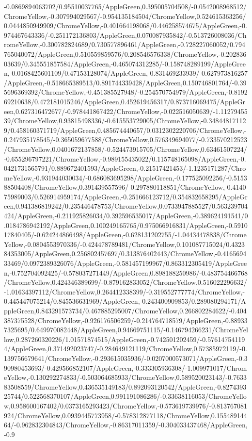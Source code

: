 {\begin{tikzternal}
-0.0869894063702/0.95510037765/AppleGreen,0.395005704508/-0.0542008968512/ChromeYellow,-0.307994029567/-0.954135184504/ChromeYellow,0.524615363256/0.0444850949909/ChromeYellow,-0.401664198068/0.446258574675/AppleGreen,-0.974467643336/-0.251172136803/AppleGreen,0.070087935842/-0.513726008036/ChromeYellow,-0.300782824689/0.730577896461/AppleGreen,-0.728227060052/0.794765040072/AppleGreen,0.510559859576/0.208546576338/ChromeYellow,-0.20283603639/0.345551857584/AppleGreen,-0.465074312285/-0.158748289199/AppleGreen,-0.0168425601109/0.47153128074/AppleGreen,-0.831469233939/-0.627973816257/AppleGreen,-0.518665389513/0.891744339428/AppleGreen,0.150746801764/-0.395696369392/ChromeYellow,-0.451385527948/-0.254570754979/AppleGreen,-0.819269210638/0.472181015246/AppleGreen,0.452619456317/0.873716069475/AppleGreen,0.627316472677/-0.978441867422/ChromeYellow,-0.022516050639/-1.1127945539/ChromeYellow,0.93815498336/-0.615553729005/ChromeYellow,-0.348448171129/0.458160371719/AppleGreen,0.485674440657/0.0312302220706/ChromeYellow,-0.247935178545/-0.365059677588/ChromeYellow,0.576349694077/-0.733570212523/ChromeYellow,0.0401672137858/-0.524473915705/ChromeYellow,0.63461507224/-0.655296797221/ChromeYellow,-0.989155435022/0.115748165098/AppleGreen,-0.0421731565791/0.889672401593/AppleGreen,-0.21517421453/-1.1235171287/ChromeYellow,-0.931944030034/-0.686083695298/AppleGreen,-0.177525092256/-0.515388504408/ChromeYellow,0.391439557596/-0.297880118851/ChromeYellow,-0.414075989003/0.526914959174/AppleGreen,-0.251666123712/0.354832658295/AppleGreen,0.941386819242/0.235446478753/ChromeYellow,0.0733947885527/0.563239704424/AppleGreen,-0.211925826034/0.392596535017/AppleGreen,-0.389624191541/0.0184786942192/AppleGreen,0.100249165765/0.975066916831/AppleGreen,-0.591017840405/-0.624244866498/AppleGreen,-0.628131202755/-1.04434478838/ChromeYellow,-0.0804553970336/-0.424478789481/ChromeYellow,0.101087715024/0.432384353005/AppleGreen,0.256802457697/0.313876402443/ChromeYellow,-0.416569433469/0.0972389326076/AppleGreen,-0.581457199967/0.863312305419/AppleGreen,-0.752704092425/-0.578037271449/AppleGreen,0.898188250986/-0.483754466768/ChromeYellow,0.424346389699/-0.879162833052/ChromeYellow,0.516022296632/-1.01634397112/ChromeYellow,0.264412338399/-0.319552777774/ChromeYellow,-0.445447075214/0.845536631969/AppleGreen,-0.243400909853/0.289080294171/AppleGreen,0.843291573734/0.467885295007/ChromeYellow,0.266802284622/-0.404387375528/ChromeYellow,-0.926176506259/-0.214764718579/AppleGreen,-0.889337325695/0.649970082448/AppleGreen,0.94669751115/-0.146794266231/ChromeYellow,0.287260320226/1.01571874515/AppleGreen,-0.742501202459/-0.576147541194/AppleGreen,0.371492023747/-0.284649121119/ChromeYellow,0.57385972119/-0.139756679641/ChromeYellow,-0.293615035936/-0.0207000573071/AppleGreen,-0.390980453693/-0.429566852107/AppleGreen,-0.333305936308/-1.009971017/ChromeYellow,-0.130292274833/-0.503064685933/ChromeYellow,0.589520023143/-0.763383508559/ChromeYellow,0.436535149183/0.892093120542/AppleGreen,-0.827439325744/0.522568370107/AppleGreen,0.991191086286/-0.33638116053/ChromeYellow,0.958600167402/0.0373165293423/ChromeYellow,-0.573619739976/-0.813767081924/ChromeYellow,0.0939445773958/-0.578312877118/ChromeYellow,0.15548914464/-0.962832304843/ChromeYellow,-0.86317011359/-0.304033437468/AppleGreen,-0.9
\end{tikzternal}}
